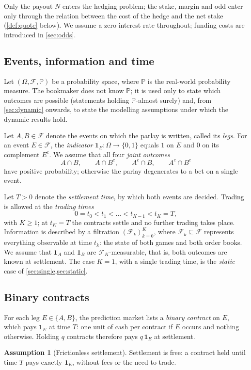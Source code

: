 \documentclass[11pt,a4paper]{article}
\theoremstyle{plain}
\theoremstyle{definition}
\newtheorem{assumption}[theorem]{Assumption}
\theoremstyle{remark}
\newcommand{\Prob}{\mathbb{P}}
\newcommand{\1}{\mathbf{1}}
\newcommand{\F}{\mathcal{F}}
\begin{document}
Only the payout $N$ enters the hedging problem; the stake, margin and odd enter only through the relation between the cost of the hedge and the net stake (\cref{def:quote} below). We assume a zero interest rate throughout; funding costs are introduced in \cref{sec:odds}.

\subsection{Events, information and time}

Let $(\Omega,\F,\Prob)$ be a probability space, where $\Prob$ is the real-world probability measure. The bookmaker does not know $\Prob$; it is used only to state which outcomes are possible (statements holding $\Prob$-almost surely) and, from \cref{sec:dynamic} onwards, to state the modelling assumptions under which the dynamic results hold.

Let $A,B\in\F$ denote the events on which the parlay is written, called its \emph{legs}. For an event $E\in\F$, the \emph{indicator} $\1_E:\Omega\to\{0,1\}$ equals $1$ on $E$ and $0$ on its complement $E^c$. We assume that all four \emph{joint outcomes}
\[
A\cap B,\qquad A\cap B^c,\qquad A^c\cap B,\qquad A^c\cap B^c
\]
have positive probability; otherwise the parlay degenerates to a bet on a single event.

Let $T>0$ denote the \emph{settlement time}, by which both events are decided. Trading is allowed at the \emph{trading times}
\[
0 = t_0 < t_1 < \dots < t_{K-1} < t_K = T,
\]
with $K\geq 1$; at $t_K=T$ the contracts settle and no further trading takes place. Information is described by a filtration $(\F_k)_{k=0}^{K}$, where $\F_k\subseteq\F$ represents everything observable at time $t_k$: the state of both games and both order books. We assume that $\1_A$ and $\1_B$ are $\F_K$-measurable, that is, both outcomes are known at settlement. The case $K=1$, with a single trading time, is the \emph{static} case of \cref{sec:single,sec:static}.

\subsection{Binary contracts}

For each leg $E\in\{A,B\}$, the prediction market lists a \emph{binary contract} on $E$, which pays $\1_E$ at time $T$: one unit of cash per contract if $E$ occurs and nothing otherwise. Holding $q$ contracts therefore pays $q\,\1_E$ at settlement.

\begin{assumption}[Frictionless settlement]
\label{ass:settlement}
Settlement is free: a contract held until time $T$ pays exactly $\1_E$, without fees or the need to trade.
\end{assumption}
\end{document}
